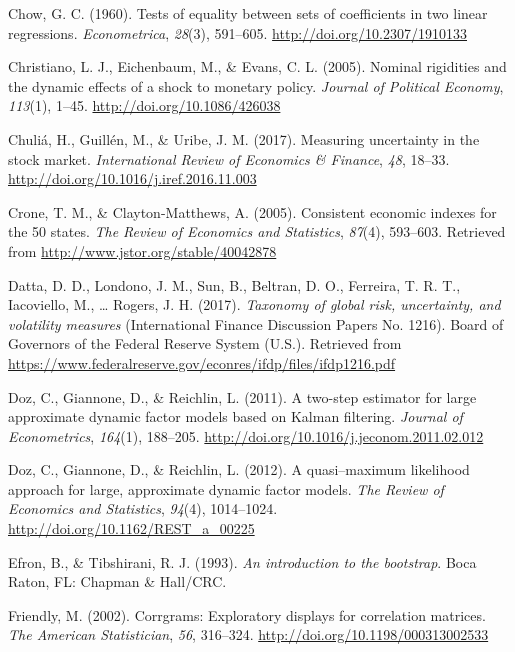 \documentclass[12pt,twoside]{reedthesis}
\begin{document}
\leavevmode\hypertarget{ref-chow:1960}{}%
Chow, G. C. (1960). Tests of equality between sets of coefficients in two linear regressions. \emph{Econometrica}, \emph{28}(3), 591--605. \url{http://doi.org/10.2307/1910133}

\leavevmode\hypertarget{ref-chrietal:2005}{}%
Christiano, L. J., Eichenbaum, M., \& Evans, C. L. (2005). Nominal rigidities and the dynamic effects of a shock to monetary policy. \emph{Journal of Political Economy}, \emph{113}(1), 1--45. \url{http://doi.org/10.1086/426038}

\leavevmode\hypertarget{ref-chuletal:2017}{}%
Chuliá, H., Guillén, M., \& Uribe, J. M. (2017). Measuring uncertainty in the stock market. \emph{International Review of Economics \& Finance}, \emph{48}, 18--33. \url{http://doi.org/10.1016/j.iref.2016.11.003}

\leavevmode\hypertarget{ref-cronclay:2005}{}%
Crone, T. M., \& Clayton-Matthews, A. (2005). Consistent economic indexes for the 50 states. \emph{The Review of Economics and Statistics}, \emph{87}(4), 593--603. Retrieved from \url{http://www.jstor.org/stable/40042878}

\leavevmode\hypertarget{ref-dattetal:2017}{}%
Datta, D. D., Londono, J. M., Sun, B., Beltran, D. O., Ferreira, T. R. T., Iacoviello, M., \ldots{} Rogers, J. H. (2017). \emph{Taxonomy of global risk, uncertainty, and volatility measures} (International Finance Discussion Papers No. 1216). Board of Governors of the Federal Reserve System (U.S.). Retrieved from \url{https://www.federalreserve.gov/econres/ifdp/files/ifdp1216.pdf}

\leavevmode\hypertarget{ref-dozetal:2011}{}%
Doz, C., Giannone, D., \& Reichlin, L. (2011). A two-step estimator for large approximate dynamic factor models based on Kalman filtering. \emph{Journal of Econometrics}, \emph{164}(1), 188--205. \url{http://doi.org/10.1016/j.jeconom.2011.02.012}

\leavevmode\hypertarget{ref-dozetal:2012}{}%
Doz, C., Giannone, D., \& Reichlin, L. (2012). A quasi--maximum likelihood approach for large, approximate dynamic factor models. \emph{The Review of Economics and Statistics}, \emph{94}(4), 1014--1024. \url{http://doi.org/10.1162/REST_a_00225}

\leavevmode\hypertarget{ref-efrotibs:1993}{}%
Efron, B., \& Tibshirani, R. J. (1993). \emph{An introduction to the bootstrap}. Boca Raton, FL: Chapman \& Hall/CRC.

\leavevmode\hypertarget{ref-friendly:2002}{}%
Friendly, M. (2002). Corrgrams: Exploratory displays for correlation matrices. \emph{The American Statistician}, \emph{56}, 316--324. \url{http://doi.org/10.1198/000313002533}
\end{document}
